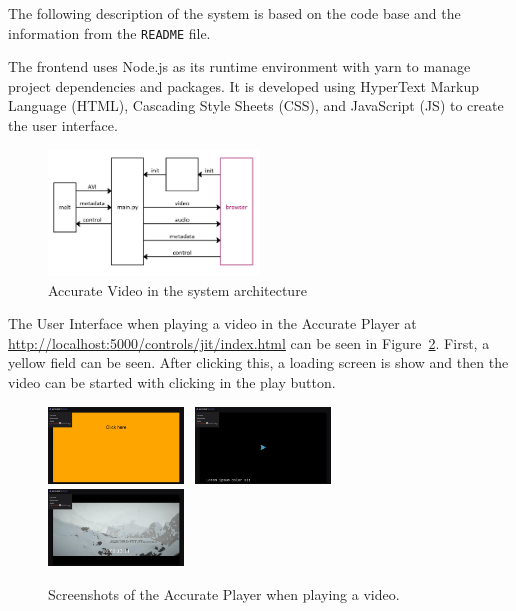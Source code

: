 \documentclass[../MasterThesis.tex]{subfiles}
\begin{document}
The following description of the system is based on the code base and the information from the \texttt{README} file.~\cite{RM_Frontend}

The frontend uses Node.js as its runtime environment with yarn to manage project dependencies and packages. It is developed using HyperText Markup Language (HTML), Cascading Style Sheets (CSS), and JavaScript (JS) to create the user interface.


\begin{figure}[H]
	\centering
	\includegraphics[width=0.5\textwidth]{IM_FE.png}
	\caption{Accurate Video in the system architecture}
	\label{figure:AS_frontend}
\end{figure}


\hypersetup{urlcolor=black}
The User Interface when playing a video in the Accurate Player at \url{http://localhost:5000/controls/jit/index.html} can be seen in Figure~\ref{figure:AV_before}. 
First, a yellow field can be seen. After clicking this, a loading screen is show and then the video can be started with clicking in the play button.


\begin{figure}[H]
	\begin{center}
		\includegraphics[width=0.32\textwidth]{AV1_before.png} \ 
		\includegraphics[width=0.32\textwidth]{AV2_before.png} \ 
		\includegraphics[width=0.32\textwidth]{AV3_before.png}
		\caption[Screenshots of the frontend.]{Screenshots of the Accurate Player when playing a video.}
		\label{figure:AV_before}
	\end{center}
\end{figure}
\end{document}
